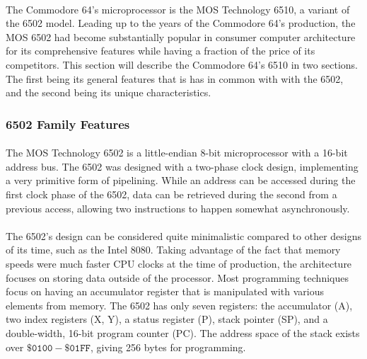 \documentclass{article}
\begin{document}
\paragraph{}
The Commodore 64's microprocessor is the MOS Technology 6510, a variant of the 6502 model. Leading up to the years of the Commodore 64's production, the MOS 6502 had become substantially popular in consumer computer architecture for its comprehensive features while having a fraction of the price of its competitors. This section will describe the Commodore 64's 6510 in two sections. The first being its general features that is has in common with with the 6502, and the second being its unique characteristics.

\subsubsection{6502 Family Features}

\paragraph{}
The MOS Technology 6502 is a little-endian 8-bit microprocessor with a 16-bit address bus. The 6502 was designed with a two-phase clock design, implementing a very primitive form of pipelining. While an address can be accessed during the first clock phase of the 6502, data can be retrieved during the second from a previous access, allowing two instructions to happen somewhat asynchronously. 

\paragraph{}
The 6502's design can be considered quite minimalistic compared to other designs of its time, such as the Intel 8080. Taking advantage of the fact that memory speeds were much faster CPU clocks at the time of production, the architecture focuses on storing data outside of the processor. Most programming techniques focus on having an accumulator register that is manipulated with various elements from memory. The 6502 has only seven registers: the accumulator (A), two index registers (X, Y), a status register (P), stack pointer (SP), and a double-width, 16-bit program counter (PC). The address space of the stack exists over $\mathtt{\$0100 - \$01FF}$, giving 256 bytes for programming. 
\end{document}
